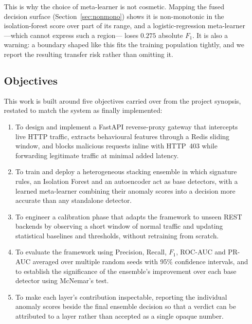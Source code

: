 \documentclass[conference]{IEEEtran}
\begin{document}
This is why the choice of meta-learner is not cosmetic. Mapping the fused decision surface
(Section~\ref{sec:nonmono}) shows it is non-monotonic in the isolation-forest score over part
of its range, and a logistic-regression meta-learner---which cannot express such a region---
loses $0.275$ absolute $F_1$. It is also a warning: a boundary shaped like this fits the
training population tightly, and we report the resulting transfer risk rather than omitting it.

\subsection{Objectives}
This work is built around five objectives carried over from the project synopsis, restated to
match the system as finally implemented:

\begin{enumerate}[leftmargin=1.4em,itemsep=1pt,topsep=2pt]
  \item To design and implement a FastAPI reverse-proxy gateway that intercepts live HTTP
        traffic, extracts behavioural features through a Redis sliding window, and blocks
        malicious requests inline with HTTP~403 while forwarding legitimate traffic at
        minimal added latency.
  \item To train and deploy a heterogeneous stacking ensemble in which signature rules, an
        Isolation Forest and an autoencoder act as base detectors, with a learned
        meta-learner combining their anomaly scores into a decision more accurate than any
        standalone detector.
  \item To engineer a calibration phase that adapts the framework to unseen REST backends by
        observing a short window of normal traffic and updating statistical baselines and
        thresholds, without retraining from scratch.
  \item To evaluate the framework using Precision, Recall, $F_1$, ROC-AUC and PR-AUC averaged
        over multiple random seeds with 95\% confidence intervals, and to establish the
        significance of the ensemble's improvement over each base detector using McNemar's
        test.
  \item To make each layer's contribution inspectable, reporting the individual anomaly
        scores beside the final ensemble decision so that a verdict can be attributed to a
        layer rather than accepted as a single opaque number.
\end{enumerate}
\end{document}
